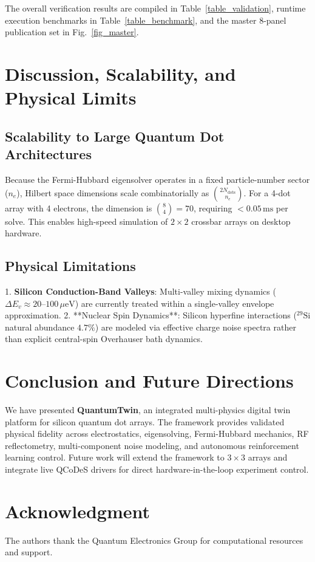 \documentclass[journal,twocolumn,10pt]{IEEEtran}
\begin{document}
The overall verification results are compiled in Table~\ref{table_validation}, runtime execution benchmarks in Table~\ref{table_benchmark}, and the master 8-panel publication set in Fig.~\ref{fig_master}.

\section{Discussion, Scalability, and Physical Limits}

\subsection{Scalability to Large Quantum Dot Architectures}
Because the Fermi-Hubbard eigensolver operates in a fixed particle-number sector ($n_e$), Hilbert space dimensions scale combinatorially as $\binom{2 N_{\text{dots}}}{n_e}$. For a 4-dot array with 4 electrons, the dimension is $\binom{8}{4} = 70$, requiring $<0.05\,\text{ms}$ per solve. This enables high-speed simulation of $2 \times 2$ crossbar arrays on desktop hardware.

\subsection{Physical Limitations}
1. \textbf{Silicon Conduction-Band Valleys}: Multi-valley mixing dynamics ($\Delta E_v \approx 20\text{--}100\,\mu\text{eV}$) are currently treated within a single-valley envelope approximation.
2. **Nuclear Spin Dynamics**: Silicon hyperfine interactions ($\text{}^{29}\text{Si}$ natural abundance $4.7\%$) are modeled via effective charge noise spectra rather than explicit central-spin Overhauser bath dynamics.

\section{Conclusion and Future Directions}
We have presented \textbf{QuantumTwin}, an integrated multi-physics digital twin platform for silicon quantum dot arrays. The framework provides validated physical fidelity across electrostatics, eigensolving, Fermi-Hubbard mechanics, RF reflectometry, multi-component noise modeling, and autonomous reinforcement learning control. Future work will extend the framework to $3 \times 3$ arrays and integrate live QCoDeS drivers for direct hardware-in-the-loop experiment control.

\section*{Acknowledgment}
The authors thank the Quantum Electronics Group for computational resources and support.
\end{document}
